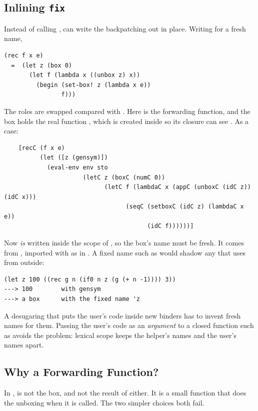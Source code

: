 \subsection{Inlining \texttt{fix}}

Instead of calling ,  can write the backpatching out in place. Writing  for a fresh name,
\begin{lstlisting}
(rec f x e)
  =  (let z (box 0)
       (let f (lambda x ((unbox z) x))
         (begin (set-box! z (lambda x e))
                f)))
\end{lstlisting}
The roles are swapped compared with . Here  is the forwarding function, and the box holds the real function , which is created inside  so its closure can see . As a  case:
\begin{lstlisting}
    [recC (f x e)
          (let ([z (gensym)])
            (eval-env env sto
                      (letC z (boxC (numC 0))
                            (letC f (lambdaC x (appC (unboxC (idC z)) (idC x)))
                                  (seqC (setboxC (idC z) (lambdaC x e))
                                        (idC f))))))]
\end{lstlisting}
Now  \emph{is} written inside the scope of , so the box's name must be fresh. It comes from , imported with  as in . A fixed name such as  would shadow any  that  uses from outside:
\begin{lstlisting}[style=repl]
(let z 100 ((rec g n (if0 n z (g (+ n -1)))) 3))
---> 100        with gensym
---> a box      with the fixed name 'z
\end{lstlisting}

\begin{keypoint}
A desugaring that puts the user's code inside new binders has to invent fresh names for them. Passing the user's code as an \emph{argument} to a closed function such as  avoids the problem: lexical scope keeps the helper's names and the user's names apart.
\end{keypoint}

\subsection{Why a Forwarding Function?}

In ,  is not the box, and not the result of  either. It is a small function that does the unboxing when it is called. The two simpler choices both fail.

